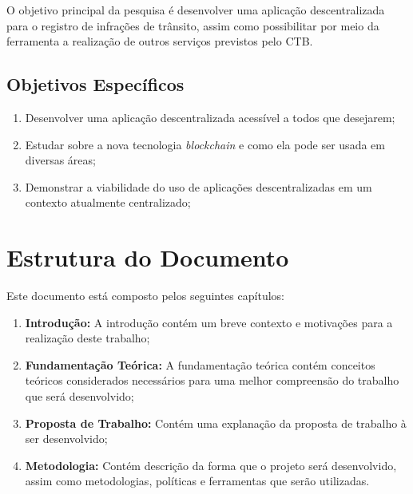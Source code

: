     O objetivo principal da pesquisa é desenvolver uma aplicação descentralizada para o registro de infrações de trânsito, assim como possibilitar por meio da ferramenta a realização de outros serviços previstos pelo CTB.
    
    \subsection{Objetivos Específicos}
    
    \begin{enumerate}
        \item Desenvolver uma aplicação descentralizada acessível a todos que desejarem;
        \item Estudar sobre a nova tecnologia \textit{blockchain} e como ela pode ser usada em diversas áreas;
        \item Demonstrar a viabilidade do uso de aplicações descentralizadas em um contexto atualmente centralizado;
    \end{enumerate}
    
    
\section{Estrutura do Documento}

Este documento está composto pelos seguintes capítulos:

\begin{enumerate}
    \item \textbf{Introdução:} A introdução contém um breve contexto e motivações para a realização deste trabalho;
    \item \textbf{Fundamentação Teórica:} A fundamentação teórica contém conceitos teóricos considerados necessários para uma melhor compreensão do trabalho que será desenvolvido;
    \item \textbf{Proposta de Trabalho:} Contém uma explanação da proposta de trabalho à ser desenvolvido;
    \item \textbf{Metodologia:} Contém descrição da forma que o projeto será desenvolvido, assim como metodologias, políticas e ferramentas que serão utilizadas.
\end{enumerate}
